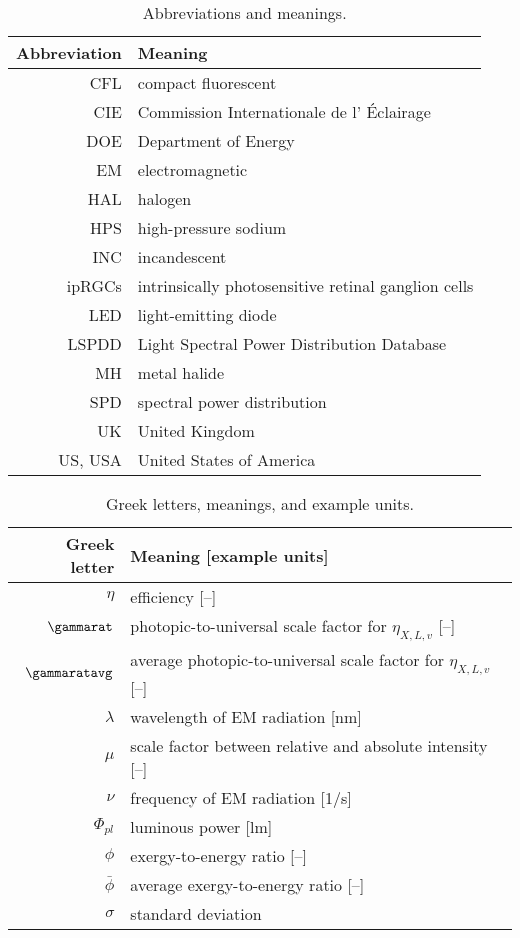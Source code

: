 \begin{table}
\centering %
\caption{Abbreviations and meanings.}
\begin{tabular}{r l}
\toprule
Abbreviation & Meaning \\
\midrule
CFL & compact fluorescent \\
CIE & Commission Internationale de l' \'{E}clairage \\
DOE & Department of Energy \\
EM & electromagnetic \\
HAL & halogen \\
HPS & high-pressure sodium \\
INC & incandescent \\
ipRGCs & intrinsically photosensitive retinal ganglion cells \\
LED & light-emitting diode \\
LSPDD & Light Spectral Power Distribution Database \\
MH & metal halide \\
SPD & spectral power distribution \\
UK & United Kingdom \\
US, USA & United States of America \\
\bottomrule
\end{tabular}
\label{tab:abbreviations}
\end{table}



\begin{table}
\centering %
\caption{Greek letters, meanings, and example units.}
\begin{tabular}{r l}
  \toprule
  Greek letter & Meaning [example units] \\
  \midrule
  $\eta$ & efficiency [--] \\
  $\gammarat$ & photopic-to-universal scale factor for $\eta_{X,L,v}$ [--] \\
  $\gammaratavg$ & average photopic-to-universal scale factor for $\eta_{X,L,v}$ [--] \\
  $\lambda$ & wavelength of EM radiation [nm] \\
  $\mu$ & scale factor between relative and absolute intensity [--] \\
  $\nu$ & frequency of EM radiation [1/s] \\
  $\Phi_{pl}$ & luminous power [lm] \\
  $\phi$ & exergy-to-energy ratio [--] \\
  $\bar{\phi}$ & average exergy-to-energy ratio [--] \\
  $\sigma$ & standard deviation \\
  \bottomrule
\end{tabular}
\label{tab:greek}
\end{table}



